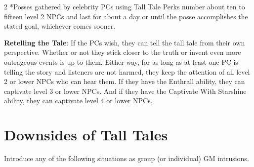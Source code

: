 \begin{multicols}{2}
*Posses gathered by celebrity PCs using Tall Tale Perks number about ten to fifteen level 2 NPCs and last for about a day or until the posse accomplishes the stated goal, whichever comes sooner.

\textbf{Retelling the Tale}: If the PCs wish, they can tell the tall tale from their own perspective. Whether or not they stick closer to the truth or invent even more outrageous events is up to them. Either way, for as long as at least one PC is telling the story and listeners are not harmed, they keep the attention of all level 2 or lower NPCs who can hear them. If they have the Enthrall ability, they can captivate level 3 or lower NPCs. And if they have the Captivate With Starshine ability, they can captivate level 4 or lower NPCs.

\section{Downsides of Tall Tales}

Introduce any of the following situations as group (or individual) GM intrusions. 

\end{multicols}

